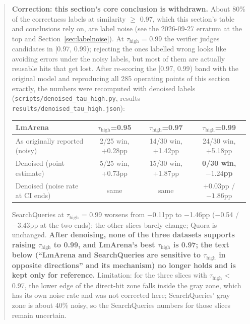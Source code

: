 \documentclass[11pt]{article}
\newenvironment{fittab}{\begin{lrbox}{\fittabbox}}{\end{lrbox}%
  \ifdim\wd\fittabbox>\linewidth\resizebox{\linewidth}{!}{\usebox{\fittabbox}}\else\usebox{\fittabbox}\fi}
\newcommand{\tauhigh}{\ensuremath{\tau_{\text{high}}}}
\begin{document}
\begin{quote}
\noindent \textbf{Correction: this section's core conclusion is withdrawn.} About 80\% of the correctness labels at similarity $\geq$ 0.97, which this section's table and conclusions rely on, are label noise (see the 2026-09-27 erratum at the top and Section~\ref{sec:labelnoise}). At \tauhigh{} = 0.99 the verifier judges candidates in [0.97, 0.99); rejecting the ones labelled wrong looks like avoiding errors under the noisy labels, but most of them are actually reusable hits that get lost. After re-scoring the [0.97, 0.99) band with the original model and reproducing all 285 operating points of this section exactly, the numbers were recomputed with denoised labels (\texttt{scripts/\allowbreak{}denoised\_\allowbreak{}tau\_\allowbreak{}high.\allowbreak{}py}, results \texttt{results/\allowbreak{}denoised\_\allowbreak{}tau\_\allowbreak{}high.\allowbreak{}json}):

\begin{center}
\small
\begin{fittab}\begin{tabular}{@{}lccc@{}}
\toprule
\textbf{LmArena} & \tauhigh\textbf{=0.95} & \tauhigh\textbf{=0.97} & \tauhigh\textbf{=0.99} \\
\midrule
As originally reported (noisy) & 2/25 win, +0.28pp & 14/30 win, +1.42pp & 24/30 win, +5.18pp \\
Denoised (point estimate) & 5/25 win, +0.73pp & 15/30 win, +1.87pp & \textbf{0/30 win, $-1.24$pp} \\
Denoised (noise rate at CI ends) & same & same & +0.03pp / $-1.86$pp \\
\bottomrule
\end{tabular}\end{fittab}
\end{center}

\noindent SearchQueries at \tauhigh{} = 0.99 worsens from $-$0.11pp to $-$1.46pp ($-$0.54 / $-$3.43pp at the two ends); the other slices barely change; Quora is unchanged. \textbf{After denoising, none of the three datasets supports raising \tauhigh{} to 0.99, and LmArena's best \tauhigh{} is 0.97; the text below (``LmArena and SearchQueries are sensitive to \tauhigh{} in opposite directions'' and its mechanism) no longer holds and is kept only for reference.} Limitation: for the three slices with \tauhigh{} < 0.97, the lower edge of the direct-hit zone falls inside the gray zone, which has its own noise rate and was not corrected here; SearchQueries' gray zone is about 40\% noisy, so the SearchQueries numbers for those slices remain uncertain.
\end{quote}
\end{document}
